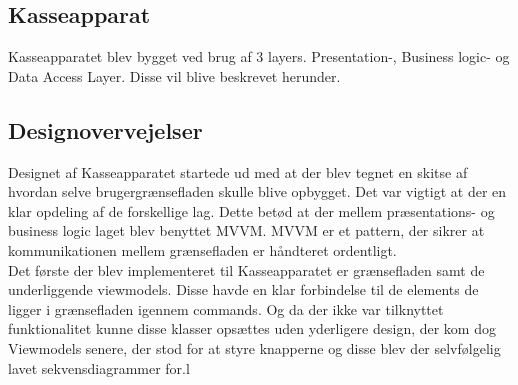 \subsection{Kasseapparat}

Kasseapparatet blev bygget ved brug af 3 layers. Presentation-, Business logic- og Data Access Layer. Disse vil blive beskrevet herunder.

\subsection{Designovervejelser}
Designet af Kasseapparatet startede ud med at der blev tegnet en skitse af hvordan selve brugergrænsefladen skulle blive opbygget.
Det var vigtigt at der en klar opdeling af de forskellige lag. Dette betød at der mellem præsentations- og business logic laget blev benyttet MVVM. MVVM er et pattern, der sikrer at kommunikationen mellem grænsefladen er håndteret ordentligt. \\
Det første der blev implementeret til Kasseapparatet er grænsefladen samt de underliggende viewmodels. Disse havde en klar forbindelse til de elements de ligger i grænsefladen igennem commands. Og da der ikke var tilknyttet funktionalitet kunne disse klasser opsættes uden yderligere design, der kom dog Viewmodels senere, der stod for at styre knapperne og disse blev der selvfølgelig lavet sekvensdiagrammer for.l





